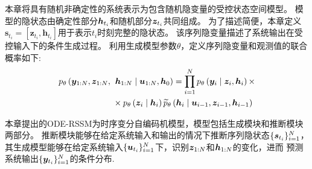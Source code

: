 本章将具有随机非确定性的系统表示为包含随机隐变量的受控状态空间模型。
模型的隐状态由确定性部分$\boldsymbol{h}_{t_i}$和随机部分$\boldsymbol{z}_{t_i}$共同组成。
为了描述简便，本章定义$\boldsymbol{s}_{t_{i}}=[\boldsymbol{z}_{t_{i}},\boldsymbol{h}_{t_{i}}]$用于表示$t_i$时刻完整的隐状态。
该序列隐变量描述了系统输出在受控输入下的条件生成过程。
利用生成模型参数$\theta$，定义序列隐变量和观测值的联合概率如下:
\begin{equation}
\begin{aligned}
p_{\theta}\left(\boldsymbol{y}_{1: N}, \boldsymbol{z}_{1: N},\right.&\left.\boldsymbol{h}_{1: N} \mid \boldsymbol{u}_{1: N}, \boldsymbol{h}_{0}\right)=\prod_{i=1}^{N}
p_{\theta}\left(\boldsymbol{y}_i \mid \boldsymbol{z}_i, \boldsymbol{h}_i\right) \times \\
& \times p_{\theta}\left(\boldsymbol{z}_i \mid \boldsymbol{h}_i\right) \widetilde{p}_{\theta}\left(\boldsymbol{h}_i \mid \boldsymbol{u}_{i-1},\boldsymbol{z}_{i-1}, \boldsymbol{h}_{i-1}\right)
\end{aligned}
\label{equ:discrete_rssm}
\end{equation}

本章提出的ODE-RSSM为时序变分自编码机模型，模型包括生成模块和推断模块两部分。
推断模块能够在给定系统输入和输出的情况下推断序列隐状态$\{\boldsymbol{s}_{t_i}\}_{i=1}^{N}$，其生成模型能够在给定系统输入$\{\boldsymbol{u}_{t_i}\}_{i=1}^{N}$下，识别$\boldsymbol z_{1:N}$和$\boldsymbol h_{1:N}$的变化，进而
预测系统输出$\{\boldsymbol{y}_{t_i}\}_{i=1}^{N}$的条件分布.

